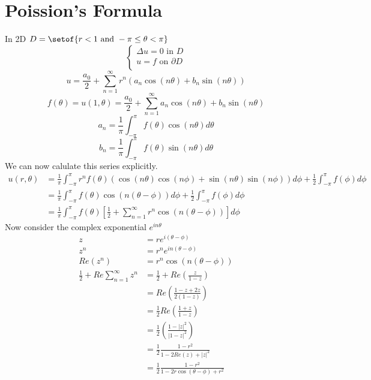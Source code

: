 \documentclass[answers, 12pts,addpoints]{exam}
\begin{document}
\section{Poission's Formula}
In 2D $D = \setof{r < 1 \text{ and } -\pi \leq \theta < \pi}$\\
$$\begin{cases}
    \Delta u = 0 \text{ in } D\\
    u = f \text{ on } \partial D\\
\end{cases}$$
$$ u = \frac{a_0}{2} + \sum_{n=1}^{\infty} r^n (a_n \cos(n\theta) + b_n \sin(n\theta))$$
$$f(\theta) = u(1,\theta) = \frac{a_0}{2} + \sum_{n=1}^{\infty} a_n \cos(n\theta) + b_n \sin(n\theta)$$
$$a_n = \frac{1}{\pi} \int_{-\pi}^{\pi} f(\theta) \cos(n\theta) d\theta$$
$$b_n = \frac{1}{\pi} \int_{-\pi}^{\pi} f(\theta) \sin(n\theta) d\theta$$
We can now calulate this series explicitly.\\
\begin{align*}
    u(r,\theta) &= \frac{1}{\pi} \int_{-\pi}^{\pi} r^n f(\theta) \left(\cos(n\theta)\cos(n\phi) + \sin(n\theta)\sin(n\phi)\right)d\phi + \frac{1}{2} \int_{-\pi}^{\pi} f(\phi)d\phi\\
    &= \frac{1}{\pi} \int_{-\pi}^{\pi} f(\theta) \cos(n(\theta - \phi))d\phi + \frac{1}{2} \int_{-\pi}^{\pi} f(\phi)d\phi\\
    &= \frac{1}{\pi} \int_{-\pi}^{\pi} f(\theta) \left[\frac{1}{2} + \sum_{n=1}^\infty r^n \cos(n(\theta - \phi))\right] d\phi
\end{align*}
Now consider the complex exponential $e^{in\theta}$\\
\begin{align*}
    z &= re^{i(\theta -\phi)}\\
    z^n &= r^n e^{in(\theta - \phi)}\\
    Re(z^n) &= r^n \cos(n(\theta - \phi))\\
    \frac{1}{2} + Re\sum_{n=1}^\infty z^n &= \frac{1}{2} + Re\left(\frac{z}{1-z}\right)\\
    &= Re\left(\frac{1-z +2z}{2(1-z)}\right)\\
    &= \frac{1}{2}Re\left(\frac{1+z}{1-z}\right)\\
    &= \frac{1}{2} \left( \frac{1- |z|^2}{|1-z|^2}\right)\\
    &= \frac{1}{2} \frac{1 - r^2}{1 - 2Re(z) + |z|^2}\\
    &= \frac{1}{2} \frac{1 - r^2}{1 - 2r\cos(\theta - \phi) + r^2}\\
\end{align*}
\end{document}
